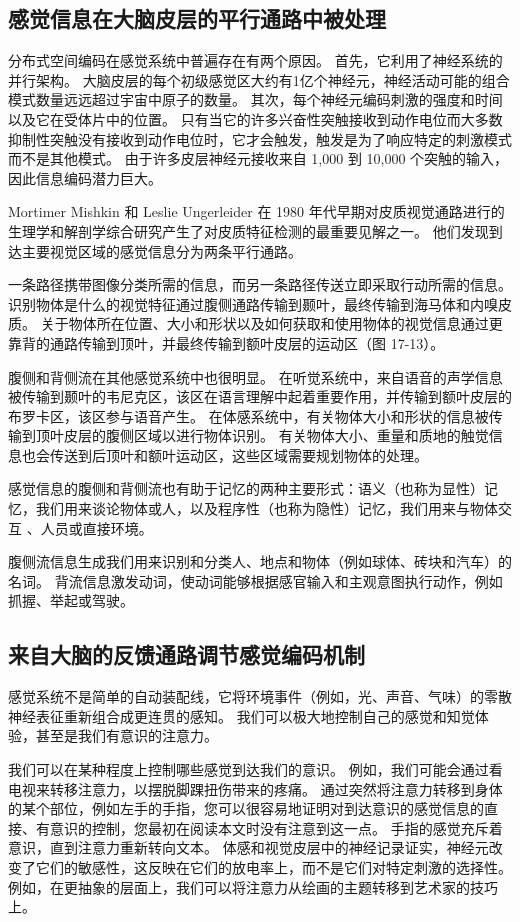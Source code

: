 \subsection{感觉信息在大脑皮层的平行通路中被处理}

分布式空间编码在感觉系统中普遍存在有两个原因。 首先，它利用了神经系统的并行架构。 大脑皮层的每个初级感觉区大约有1亿个神经元，神经活动可能的组合模式数量远远超过宇宙中原子的数量。 其次，每个神经元编码刺激的强度和时间以及它在受体片中的位置。 只有当它的许多兴奋性突触接收到动作电位而大多数抑制性突触没有接收到动作电位时，它才会触发，触发是为了响应特定的刺激模式而不是其他模式。 由于许多皮层神经元接收来自 1,000 到 10,000 个突触的输入，因此信息编码潜力巨大。

Mortimer Mishkin 和 Leslie Ungerleider 在 1980 年代早期对皮质视觉通路进行的生理学和解剖学综合研究产生了对皮质特征检测的最重要见解之一。 他们发现到达主要视觉区域的感觉信息分为两条平行通路。

一条路径携带图像分类所需的信息，而另一条路径传送立即采取行动所需的信息。 识别物体是什么的视觉特征通过腹侧通路传输到颞叶，最终传输到海马体和内嗅皮质。 关于物体所在位置、大小和形状以及如何获取和使用物体的视觉信息通过更靠背的通路传输到顶叶，并最终传输到额叶皮层的运动区（图 17-13）。

腹侧和背侧流在其他感觉系统中也很明显。 在听觉系统中，来自语音的声学信息被传输到颞叶的韦尼克区，该区在语言理解中起着重要作用，并传输到额叶皮层的布罗卡区，该区参与语音产生。 在体感系统中，有关物体大小和形状的信息被传输到顶叶皮层的腹侧区域以进行物体识别。 有关物体大小、重量和质地的触觉信息也会传送到后顶叶和额叶运动区，这些区域需要规划物体的处理。

感觉信息的腹侧和背侧流也有助于记忆的两种主要形式：语义（也称为显性）记忆，我们用来谈论物体或人，以及程序性（也称为隐性）记忆，我们用来与物体交互 、人员或直接环境。

腹侧流信息生成我们用来识别和分类人、地点和物体（例如球体、砖块和汽车）的名词。 背流信息激发动词，使动词能够根据感官输入和主观意图执行动作，例如抓握、举起或驾驶。


\subsection{来自大脑的反馈通路调节感觉编码机制}

感觉系统不是简单的自动装配线，它将环境事件（例如，光、声音、气味）的零散神经表征重新组合成更连贯的感知。 我们可以极大地控制自己的感觉和知觉体验，甚至是我们有意识的注意力。

我们可以在某种程度上控制哪些感觉到达我们的意识。 例如，我们可能会通过看电视来转移注意力，以摆脱脚踝扭伤带来的疼痛。 通过突然将注意力转移到身体的某个部位，例如左手的手指，您可以很容易地证明对到达意识的感觉信息的直接、有意识的控制，您最初在阅读本文时没有注意到这一点。 手指的感觉充斥着意识，直到注意力重新转向文本。 体感和视觉皮层中的神经记录证实，神经元改变了它们的敏感性，这反映在它们的放电率上，而不是它们对特定刺激的选择性。 例如，在更抽象的层面上，我们可以将注意力从绘画的主题转移到艺术家的技巧上。

